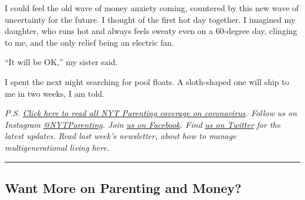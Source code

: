 I could feel the old wave of money anxiety coming, countered by this new
wave of uncertainty for the future. I thought of the first hot day
together. I imagined my daughter, who runs hot and always feels sweaty
even on a 60-degree day, clinging to me, and the only relief being an
electric fan.

``It will be OK,'' my sister said.

I spent the next night searching for pool floats. A sloth-shaped one
will ship to me in two weeks, I am told.

\emph{P.S.}
\href{https://www.nytimes3xbfgragh.onion/spotlight/parenting-kids-coronavirus}{\emph{Click
here to read all NYT Parenting coverage on coronavirus}}\emph{. Follow
us on Instagram}
\href{https://nl.nytimes3xbfgragh.onion/f/a/KbjXDcX6H0j8UEI7pPcixg~~/AAAAAQA~/RgRfwNx_P0TIaHR0cHM6Ly93d3cuaW5zdGFncmFtLmNvbS9ueXRwYXJlbnRpbmcvP3RlPTEmbmw9bnl0LXBhcmVudGluZyZlbWM9ZWRpdF9wdGdfMjAxOTExMjc_Y2FtcGFpZ25faWQ9MTE4Jmluc3RhbmNlX2lkPTE0MTI0JnNlZ21lbnRfaWQ9MTkxMzImdXNlcl9pZD04NWJmMjRhZjE2MTk0YTlkZjgxMGQ3OTZhMzU4NmVlZCZyZWdpX2lkPTg5OTQ5NDMxMjAxOTExMjdXA255dEIKABt_V95d7BxQnFIbbWVsb255Y2UubWNhZmVlQG55dGltZXMuY29tWAQAAAAA}{\emph{@NYTParenting}}\emph{.
Join}
\href{https://nl.nytimes3xbfgragh.onion/f/a/vsa5Ga3bcTyDwVsY509i_w~~/AAAAAQA~/RgRfwNx_P0THaHR0cHM6Ly93d3cuZmFjZWJvb2suY29tL255dHBhcmVudGluZy8_dGU9MSZubD1ueXQtcGFyZW50aW5nJmVtYz1lZGl0X3B0Z18yMDE5MTEyNz9jYW1wYWlnbl9pZD0xMTgmaW5zdGFuY2VfaWQ9MTQxMjQmc2VnbWVudF9pZD0xOTEzMiZ1c2VyX2lkPTg1YmYyNGFmMTYxOTRhOWRmODEwZDc5NmEzNTg2ZWVkJnJlZ2lfaWQ9ODk5NDk0MzEyMDE5MTEyN1cDbnl0QgoAG39X3l3sHFCcUhttZWxvbnljZS5tY2FmZWVAbnl0aW1lcy5jb21YBAAAAAA~}{\emph{us
on Facebook}}\emph{. Find}
\href{https://nl.nytimes3xbfgragh.onion/f/a/swlUZzCVQVD_-CDgazvCtw~~/AAAAAQA~/RgRfwNx_P0TCaHR0cHM6Ly90d2l0dGVyLmNvbS9ueXRwYXJlbnRpbmcvP3RlPTEmbmw9bnl0LXBhcmVudGluZyZlbWM9ZWRpdF9wdGdfMjAxOTExMjc_Y2FtcGFpZ25faWQ9MTE4Jmluc3RhbmNlX2lkPTE0MTI0JnNlZ21lbnRfaWQ9MTkxMzImdXNlcl9pZD04NWJmMjRhZjE2MTk0YTlkZjgxMGQ3OTZhMzU4NmVlZCZyZWdpX2lkPTg5OTQ5NDMxMjAxOTExMjdXA255dEIKABt_V95d7BxQnFIbbWVsb255Y2UubWNhZmVlQG55dGltZXMuY29tWAQAAAAA}{\emph{us
on Twitter}} \emph{for the latest updates. Read last week's newsletter,
about how to manage multigenerational living here.}

\begin{center}\rule{0.5\linewidth}{\linethickness}\end{center}

\hypertarget{want-more-on-parenting-and-money}{%
\subsection{Want More on Parenting and
Money?}\label{want-more-on-parenting-and-money}}

